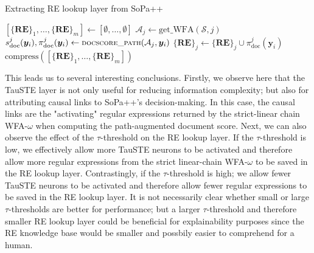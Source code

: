 \begin{algorithm}[t!]
  \small
  \caption{Extracting RE lookup layer from SoPa++}
  \label{algo:simplification_process}
  \begin{algorithmic}[1]
    \Statex
    \State $[\{\textbf{RE}\}_1, \ldots, \{\textbf{RE}\}_m] \gets [\emptyset,
    \ldots, \emptyset]$
    \State $\mathcal{A}_j \gets \text{get\_WFA}(\mathcal{S}, j)$
    \State $s^j_{\text{doc}}(\bm{y}_i), \pi^j_{\text{doc}}(\bm{y}_i) \gets
    {\small\textsc{docscore\_path}}(\mathcal{A}_j, \bm{y}_i)$
    \State $\{\textbf{RE}\}_j \gets \{\textbf{RE}\}_j \cup
    \pi^j_{\text{doc}}(\bm{y}_i)$
    \EndIf
    \EndFor
    \EndFor
    \State \Return $\text{compress}([\{\textbf{RE}\}_1, \ldots, \{\textbf{RE}\}_m])$
    \EndFunction
  \end{algorithmic}
\end{algorithm}

This leads us to several interesting conclusions. Firstly, we observe here that
the TauSTE layer is not only useful for reducing information complexity; but
also for attributing causal links to SoPa++'s decision-making. In this case,
the causal links are the "activating" regular expressions returned by the
strict-linear chain WFA-$\omega$ when computing the path-augmented document
score. Next, we can also observe the effect of the $\tau$-threshold on the RE
lookup layer. If the $\tau$-threshold is low, we effectively allow more TauSTE
neurons to be activated and therefore allow more regular expressions from the
strict linear-chain WFA-$\omega$ to be saved in the RE lookup layer.
Contrastingly, if the $\tau$-threshold is high; we allow fewer TauSTE neurons to
be activated and therefore allow fewer regular expressions to be saved in the RE
lookup layer. It is not necessarily clear whether small or large
$\tau$-thresholds are better for performance; but a larger $\tau$-threshold and
therefore smaller RE lookup layer could be beneficial for explainability
purposes since the RE knowledge base would be smaller and possbily easier
to comprehend for a human. 

